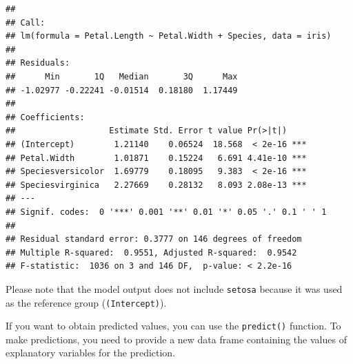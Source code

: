 \documentclass[
]{article}
\newenvironment{Shaded}{\begin{snugshade}}{\end{snugshade}}
\newcommand{\AttributeTok}[1]{\textcolor[rgb]{0.77,0.63,0.00}{#1}}
\newcommand{\CommentTok}[1]{\textcolor[rgb]{0.56,0.35,0.01}{\textit{#1}}}
\newcommand{\DecValTok}[1]{\textcolor[rgb]{0.00,0.00,0.81}{#1}}
\newcommand{\FunctionTok}[1]{\textcolor[rgb]{0.00,0.00,0.00}{#1}}
\newcommand{\NormalTok}[1]{#1}
\newcommand{\OtherTok}[1]{\textcolor[rgb]{0.56,0.35,0.01}{#1}}
\newcommand{\SpecialCharTok}[1]{\textcolor[rgb]{0.00,0.00,0.00}{#1}}
\begin{document}
\begin{verbatim}
## 
## Call:
## lm(formula = Petal.Length ~ Petal.Width + Species, data = iris)
## 
## Residuals:
##      Min       1Q   Median       3Q      Max 
## -1.02977 -0.22241 -0.01514  0.18180  1.17449 
## 
## Coefficients:
##                   Estimate Std. Error t value Pr(>|t|)    
## (Intercept)        1.21140    0.06524  18.568  < 2e-16 ***
## Petal.Width        1.01871    0.15224   6.691 4.41e-10 ***
## Speciesversicolor  1.69779    0.18095   9.383  < 2e-16 ***
## Speciesvirginica   2.27669    0.28132   8.093 2.08e-13 ***
## ---
## Signif. codes:  0 '***' 0.001 '**' 0.01 '*' 0.05 '.' 0.1 ' ' 1
## 
## Residual standard error: 0.3777 on 146 degrees of freedom
## Multiple R-squared:  0.9551, Adjusted R-squared:  0.9542 
## F-statistic:  1036 on 3 and 146 DF,  p-value: < 2.2e-16
\end{verbatim}

Please note that the model output does not include \texttt{setosa} because it was used as the reference group (\texttt{(Intercept)}).

If you want to obtain predicted values, you can use the \texttt{predict()} function. To make predictions, you need to provide a new data frame containing the values of explanatory variables for the prediction.

\begin{Shaded}
\end{Shaded}
\end{document}
